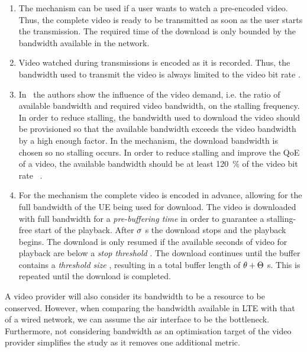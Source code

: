 \begin{enumerate}
\item \textbf{\download} The \emph{\download} mechanism can be used if a user wants to watch a pre-encoded video.
Thus, the complete video is ready to be transmitted as soon as the user starts the transmission.
The required time of the download is only bounded by the bandwidth available in the network.

\item \textbf{\live} Video watched during \emph{\live} transmissions is encoded as it is recorded.
Thus, the bandwidth used to transmit the video is always limited to the video bit rate \bitrate.

\item \textbf{\serviceprovisioning} In~\cite{Hossfeld2011a} the authors show the influence of the video demand, i.e. the ratio of available bandwidth and required video bandwidth, on the stalling frequency.
In order to reduce stalling, the bandwidth used to download the video should be provisioned so that the available bandwidth exceeds the video bandwidth by a high enough factor.
In the \emph{\serviceprovisioning} mechanism, the download bandwidth is chosen so no stalling occurs.
In order to reduce stalling and improve the \gls{QoE} of a video, the available bandwidth should be at least \SI{120}{\percent} of the video bit rate \bitrate~\cite{Hossfeld13a}.

\item \textbf{\streaming} For the \emph{\streaming} mechanism the complete video is encoded in advance, allowing for the full bandwidth of the \gls{UE} being used for download.
The video is downloaded with full bandwidth for a \emph{pre-buffering time} \streamingstart in order to guarantee a stalling-free start of the playback.
After \(\sigma\) \si{\second} the download stops and the playback begins.
The download is only resumed if the available seconds of video for playback are below a \emph{stop threshold} \bufferlower.
The download continues until the buffer contains a \emph{threshold size} \buffersize, resulting in a total buffer length of \(\theta + \Theta\) \si{\second}.
This is repeated until the download is completed.
\end{enumerate}

A video provider will also consider its bandwidth to be a resource to be conserved.
However, when comparing the bandwidth available in \gls{LTE} with that of a wired network, we can assume the air interface to be the bottleneck.
Furthermore, not considering bandwidth as an optimisation target of the video provider simplifies the study as it removes one additional metric.

